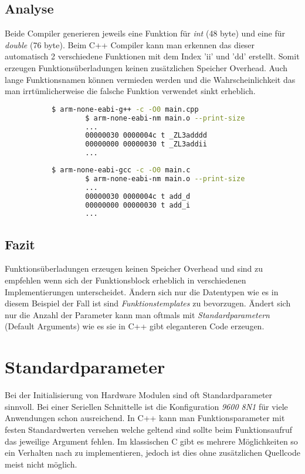 \documentclass[MES,Master,ngerman]{twbook}%
\begin{document}
\subsection{Analyse}
Beide Compiler generieren jeweils eine Funktion für \textit{int} (48 byte) und eine für \textit{double} (76 byte). Beim C++ Compiler kann man erkennen das dieser automatisch 2 verschiedene Funktionen mit dem Index 'ii' und 'dd' erstellt. Somit erzeugen Funktionsüberladungen keinen zusätzlichen Speicher Overhead. Auch lange Funktionsnamen können vermieden werden und die Wahrscheinlichkeit das man irrtümlicherweise die falsche Funktion verwendet sinkt erheblich.
\begin{figure}[!htb]
	\begin{subfigure}[b]{0.5\textwidth}
		\begin{lstlisting}[gobble=6, title={Analyse C++}, language=bash, numbers=none]
		$ arm-none-eabi-g++ -c -O0 main.cpp
		$ arm-none-eabi-nm main.o --print-size
		...
		00000030 0000004c t _ZL3adddd
		00000000 00000030 t _ZL3addii
		...
		\end{lstlisting}
	\end{subfigure}
	\begin{subfigure}[b]{0.5\textwidth}
		\begin{lstlisting}[gobble=6, title={Analyse C}, language=bash, numbers=none]
		$ arm-none-eabi-gcc -c -O0 main.c
		$ arm-none-eabi-nm main.o --print-size
		...
		00000030 0000004c t add_d
		00000000 00000030 t add_i
		...
		\end{lstlisting}
	\end{subfigure}
\end{figure}

\subsection{Fazit}
Funktionsüberladungen erzeugen keinen Speicher Overhead und sind zu empfehlen wenn sich der Funktionsblock erheblich in verschiedenen Implementierungen unterscheidet. Ändern sich nur die Datentypen wie es in diesem Beispiel der Fall ist sind \textit{Funktionstemplates} zu bevorzugen. Ändert sich nur die Anzahl der Parameter kann man oftmals mit \textit{Standardparametern} (Default Arguments) wie es sie in C++ gibt eleganteren Code erzeugen.

\newpage
\section{Standardparameter}
Bei der Initialisierung von Hardware Modulen sind oft Standardparameter sinnvoll. Bei einer Seriellen Schnittelle ist die Konfiguration \textit{9600 8N1} für viele Anwendungen schon ausreichend. In C++ kann man Funktionsparameter mit festen Standardwerten versehen welche geltend sind sollte beim Funktionsaufruf das jeweilige Argument fehlen. Im klassischen C gibt es mehrere Möglichkeiten so ein Verhalten nach zu implementieren, jedoch ist dies ohne zusätzlichen Quellcode meist nicht möglich.
\end{document}
